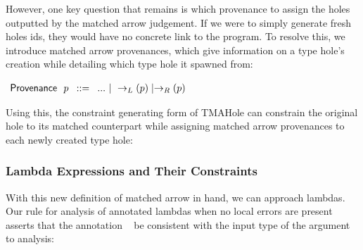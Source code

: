 However, one key question that remains is which provenance to assign the holes outputted by the matched arrow judgement. If we were to simply generate fresh holes ids, they would have no concrete link to the program. To resolve this, we introduce matched arrow provenances, which give information on a type hole's creation while detailing which type hole it spawned from:
\begin{center}
    $\arraycolsep=4pt\begin{array}{lll}
    \Prov~~ p & ::= & 
        ... ~\vert~ 
        \rightarrow_L(\Provp) \mid \rightarrow_R(\Provp)
        \\
    \end{array}$
\end{center}
Using this, the constraint generating form of TMAHole can constrain the original hole to its matched counterpart while assigning matched arrow provenances to each newly created type hole:
\begin{mathpar}
\end{mathpar}

\subsubsection{Lambda Expressions and Their Constraints}
With this new definition of matched arrow in hand, we can approach lambdas. Our rule for analysis of annotated lambdas when no local errors are present asserts that the annotation \TMV~ be consistent with the input type of the argument to analysis:
\begin{mathpar}
\end{mathpar}

